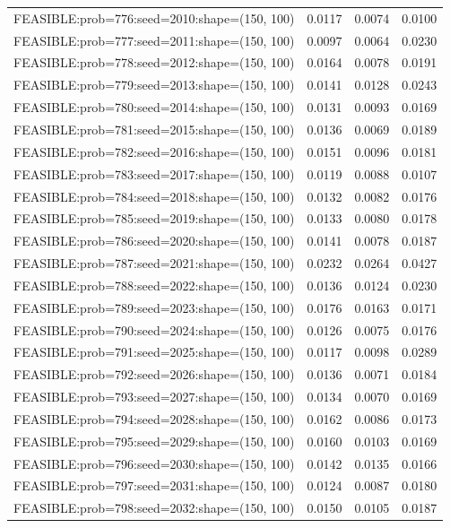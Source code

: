 \begin{longtable}{lccc}
FEASIBLE:prob=776:seed=2010:shape=(150, 100) &   0.0117 & 0.0074 & 0.0100 \\
FEASIBLE:prob=777:seed=2011:shape=(150, 100) &   0.0097 & 0.0064 & 0.0230 \\
FEASIBLE:prob=778:seed=2012:shape=(150, 100) &   0.0164 & 0.0078 & 0.0191 \\
FEASIBLE:prob=779:seed=2013:shape=(150, 100) &   0.0141 & 0.0128 & 0.0243 \\
FEASIBLE:prob=780:seed=2014:shape=(150, 100) &   0.0131 & 0.0093 & 0.0169 \\
FEASIBLE:prob=781:seed=2015:shape=(150, 100) &   0.0136 & 0.0069 & 0.0189 \\
FEASIBLE:prob=782:seed=2016:shape=(150, 100) &   0.0151 & 0.0096 & 0.0181 \\
FEASIBLE:prob=783:seed=2017:shape=(150, 100) &   0.0119 & 0.0088 & 0.0107 \\
FEASIBLE:prob=784:seed=2018:shape=(150, 100) &   0.0132 & 0.0082 & 0.0176 \\
FEASIBLE:prob=785:seed=2019:shape=(150, 100) &   0.0133 & 0.0080 & 0.0178 \\
FEASIBLE:prob=786:seed=2020:shape=(150, 100) &   0.0141 & 0.0078 & 0.0187 \\
FEASIBLE:prob=787:seed=2021:shape=(150, 100) &   0.0232 & 0.0264 & 0.0427 \\
FEASIBLE:prob=788:seed=2022:shape=(150, 100) &   0.0136 & 0.0124 & 0.0230 \\
FEASIBLE:prob=789:seed=2023:shape=(150, 100) &   0.0176 & 0.0163 & 0.0171 \\
FEASIBLE:prob=790:seed=2024:shape=(150, 100) &   0.0126 & 0.0075 & 0.0176 \\
FEASIBLE:prob=791:seed=2025:shape=(150, 100) &   0.0117 & 0.0098 & 0.0289 \\
FEASIBLE:prob=792:seed=2026:shape=(150, 100) &   0.0136 & 0.0071 & 0.0184 \\
FEASIBLE:prob=793:seed=2027:shape=(150, 100) &   0.0134 & 0.0070 & 0.0169 \\
FEASIBLE:prob=794:seed=2028:shape=(150, 100) &   0.0162 & 0.0086 & 0.0173 \\
FEASIBLE:prob=795:seed=2029:shape=(150, 100) &   0.0160 & 0.0103 & 0.0169 \\
FEASIBLE:prob=796:seed=2030:shape=(150, 100) &   0.0142 & 0.0135 & 0.0166 \\
FEASIBLE:prob=797:seed=2031:shape=(150, 100) &   0.0124 & 0.0087 & 0.0180 \\
FEASIBLE:prob=798:seed=2032:shape=(150, 100) &   0.0150 & 0.0105 & 0.0187 \\

\end{longtable}
